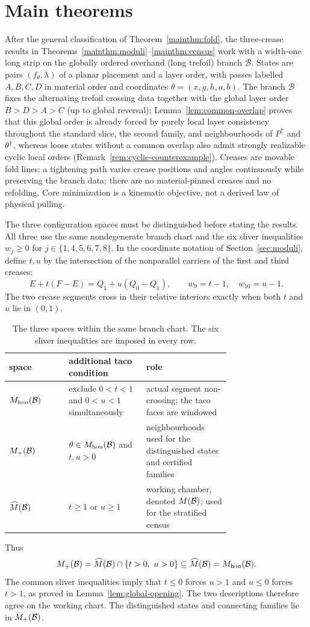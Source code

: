 \section{Main theorems}\label{sec:mainresults}

After the general classification of Theorem~\ref{mainthm:fold}, the three-crease results in Theorems~\ref{mainthm:moduli}--\ref{mainthm:census} work with a width-one long strip on the globally ordered overhand (long trefoil) branch $\mathcal B$. States are pairs $(f_\theta,\lambda)$ of a planar placement and a layer order, with passes labelled $A,B,C,D$ in material order and coordinates $\theta=(x,g,h,a,b)$. The branch $\mathcal B$ fixes the alternating trefoil crossing data together with the global layer order $B>D>A>C$ (up to global reversal); Lemma~\ref{lem:common-overlap} proves that this global order is already forced by purely local layer consistency throughout the standard slice, the second family, and neighbourhoods of $P^*$ and $\theta^\dagger$, whereas loose states without a common overlap also admit strongly realizable cyclic local orders (Remark~\ref{rem:cyclic-counterexample}). Creases are movable fold lines: a tightening path varies crease positions and angles continuously while preserving the branch data; there are no material-pinned creases and no refolding. Core minimization is a kinematic objective, not a derived law of physical pulling.

The three configuration spaces must be distinguished before stating the results. All three use the same nondegenerate branch chart and the six sliver inequalities $w_j\ge0$ for $j\in\{1,4,5,6,7,8\}$. In the coordinate notation of Section~\ref{sec:moduli}, define $t,u$ by the intersection of the nonparallel carriers of the first and third creases:
\[
 E+t(F-E)=Q_1+u(Q_0-Q_1),\qquad w_9=t-1,\quad w_{10}=u-1.
\]
The two crease segments cross in their relative interiors exactly when both $t$ and $u$ lie in $(0,1)$.
\begin{table}[ht]
\centering\small
\begin{tabular}{lp{0.35\linewidth}p{0.38\linewidth}}
\hline
space & additional taco condition & role\tabularnewline
\hline
$M_{\mathrm{hon}}(\mathcal{B})$ & \raggedright exclude $0<t<1$ and $0<u<1$ simultaneously & \raggedright actual segment non-crossing; the taco faces are windowed\tabularnewline
$M_{+}(\mathcal{B})$ & \raggedright $\theta\in M_{\mathrm{hon}}(\mathcal{B})$ and $t,u>0$ & \raggedright neighbourhoods used for the distinguished states and certified families\tabularnewline
$\widehat{M}(\mathcal{B})$ & \raggedright $t\ge1$ or $u\ge1$ & \raggedright working chamber, denoted $M(\mathcal{B})$; used for the stratified census\tabularnewline
\hline
\end{tabular}
\caption{The three spaces within the same branch chart. The six sliver inequalities are imposed in every row.}
\label{tab:spaces}
\end{table}
Thus
\[
 M_{+}(\mathcal{B})=\widehat{M}(\mathcal{B})\cap\{t>0,\ u>0\}
 \subseteq\widehat{M}(\mathcal{B})=M_{\mathrm{hon}}(\mathcal{B}).
\]
The common sliver inequalities imply that $t\le0$ forces $u>1$ and $u\le0$ forces $t>1$, as proved in Lemma~\ref{lem:global-opening}. The two descriptions therefore agree on the working chart. The distinguished states and connecting families lie in $M_{+}(\mathcal{B})$.

